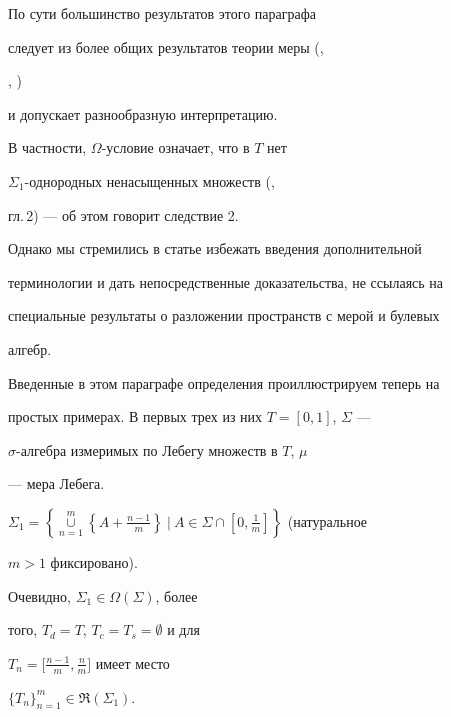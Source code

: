 \begin{note}


По сути большинство результатов этого параграфа


следует из более общих результатов теории меры (\cite{25},


\cite{28}, \cite{29})


и допускает разнообразную интерпретацию.


В частности, $\Omega$-ус\-ло\-вие означает, что в $T$ нет


$\Sigma_1$-од\-но\-род\-ных ненасыщенных множеств (\cite{29},


гл.\,2) --- об этом говорит следствие 2.


Однако мы стремились в статье избежать введения дополнительной


терминологии и дать непосредственные доказательства, не ссылаясь на


специальные результаты о разложении пространств с мерой и булевых


алгебр.


\end{note}





Введенные в этом параграфе определения проиллюстрируем теперь на


простых примерах. В первых трех из них $T=[0,1]$, $\Sigma$ ---


$\sigma$-ал\-геб\-ра измеримых по Лебегу множеств в $T$, $\mu$


--- мера Лебега.





\begin{exam}


$\Sigma_1=\left\{\mathop{\cup}\limits_{n=1}^{m}


\left\{A+\frac{n-1}{m}\right\}\:\Big |\:


A\in\Sigma\cap\left[0,\frac{1}{m}\right]\right\}$ (натуральное


$m>1$ фиксировано).


Очевидно, $\Sigma_1\in{\Omega}(\Sigma)$, более


того, $T_d=T$, $T_c=T_s=\emptyset$ и для


$T_n=\big[\frac{n-1}{m},\frac{n}{m}\big]$ имеет место


$\{T_n\}_{n=1}^m\in\Re(\Sigma_1)$.


\end{exam}





